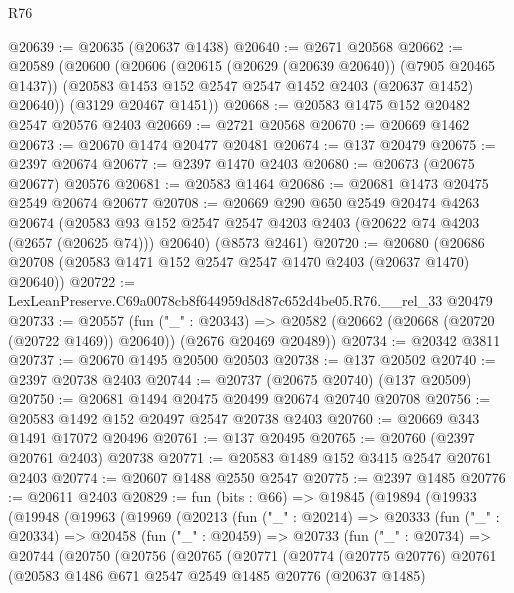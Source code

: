 \begin{lexlean}{R76}
\begin{coremodule}
@20639 := @20635 (@20637 @1438)
@20640 := @2671 @20568
@20662 := @20589
    (@20600
      (@20606
        (@20615 (@20629 (@20639 @20640)) (@7905 @20465 @1437))
        (@20583 @1453 @152 @2547 @2547 @1452 @2403 (@20637 @1452) @20640))
      (@3129 @20467 @1451))
@20668 := @20583 @1475 @152 @20482 @2547 @20576 @2403
@20669 := @2721 @20568
@20670 := @20669 @1462
@20673 := @20670 @1474 @20477 @20481
@20674 := @137 @20479
@20675 := @2397 @20674
@20677 := @2397 @1470 @2403
@20680 := @20673 (@20675 @20677) @20576
@20681 := @20583 @1464
@20686 := @20681 @1473 @20475 @2549 @20674 @20677
@20708 := @20669
    @290
    @650
    @2549
    @20474
    @4263
    @20674
    (@20583 @93 @152 @2547 @2547 @4203 @2403 (@20622 @74 @4203 (@2657 (@20625 @74))) @20640)
    (@8573 @2461)
@20720 := @20680 (@20686 @20708 (@20583 @1471 @152 @2547 @2547 @1470 @2403 (@20637 @1470) @20640))
@20722 := LexLeanPreserve.C69a0078cb8f644959d8d87c652d4be05.R76.__rel_33 @20479
@20733 := @20557
    (fun ("_" : @20343) =>
    @20582 (@20662 (@20668 (@20720 (@20722 @1469)) @20640)) (@2676 @20469 @20489))
@20734 := @20342 @3811
@20737 := @20670 @1495 @20500 @20503
@20738 := @137 @20502
@20740 := @2397 @20738 @2403
@20744 := @20737 (@20675 @20740) (@137 @20509)
@20750 := @20681 @1494 @20475 @20499 @20674 @20740 @20708
@20756 := @20583 @1492 @152 @20497 @2547 @20738 @2403
@20760 := @20669 @343 @1491 @17072 @20496
@20761 := @137 @20495
@20765 := @20760 (@2397 @20761 @2403) @20738
@20771 := @20583 @1489 @152 @3415 @2547 @20761 @2403
@20774 := @20607 @1488 @2550 @2547
@20775 := @2397 @1485
@20776 := @20611 @2403
@20829 := fun (bits : @66) =>
  @19845
    (@19894
      (@19933
        (@19948
          (@19963
            (@19969
              (@20213
                (fun ("_" : @20214) =>
                @20333
                  (fun ("_" : @20334) =>
                  @20458
                    (fun ("_" : @20459) =>
                    @20733
                      (fun ("_" : @20734) =>
                      @20744
                        (@20750
                          (@20756
                            (@20765
                              (@20771
                                (@20774
                                  (@20775 @20776)
                                  @20761
                                  (@20583
                                    @1486
                                    @671
                                    @2547
                                    @2549
                                    @1485
                                    @20776
                                    (@20637 @1485)

\end{coremodule}
\end{lexlean}
